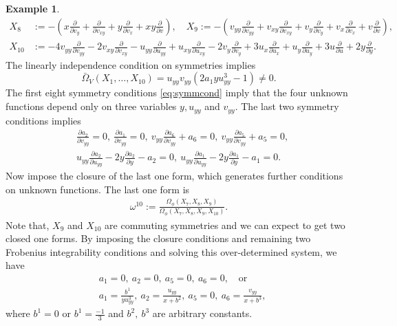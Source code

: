 \documentclass[a4paper, 11pt]{amsart}
\theoremstyle{definition}
\newtheorem{example}[theorem]{Example}
\begin{document}
\begin{example}
\begin{align*}
X_8&:=-(x{\frac{\partial}{\partial{v_y}}}+{\frac{\partial}{\partial{v_{xy}}}}+y{\frac{\partial}{\partial{v_x}}}+xy{\frac{\partial}{\partial{v}}}),\quad  X_9:=-(v_{yy}{\frac{\partial}{\partial{v_{yy}}}}+v_{xy}{\frac{\partial}{\partial{v_{xy}}}}+v_y{\frac{\partial}{\partial{v_y}}}+v_x{\frac{\partial}{\partial{v_x}}}+v{\frac{\partial}{\partial{v}}}),\\
X_{10}&:=-4v_{yy}{\frac{\partial}{\partial{v_{yy}}}}-2v_{xy}{\frac{\partial}{\partial{v_{xy}}}}-u_{yy}{\frac{\partial}{\partial{u_{yy}}}}+u_{xy}{\frac{\partial}{\partial{u_{xy}}}}-2v_{y}{\frac{\partial}{\partial{v_{y}}}}+3u_x{\frac{\partial}{\partial{u_{x}}}}+u_y{\frac{\partial}{\partial{u_y}}}+3u{\frac{\partial}{\partial{u}}}+2y{\frac{\partial}{\partial{y}}}.
\end{align*}
The linearly independence condition on symmetries implies \[\bar{\Omega}_V(X_1,\ldots,X_{10})=u_{yy}v_{yy}(2a_1yu_{yy}^3-1)\neq 0.\]
The first eight symmetry conditions \eqref{eq:symmcond} imply that the four unknown functions depend only on three variables $y,u_{yy}$ and $v_{yy}.$ The last two symmetry conditions implies
\begin{align*}
&{\frac{\partial{a_2}}{\partial{v_{yy}}}}=0,~{\frac{\partial{a_1}}{\partial{v_{yy}}}}=0,~v_{yy}{\frac{\partial{a_6}}{\partial{v_{yy}}}}+a_6=0,~v_{yy}{\frac{\partial{a_5}}{\partial{v_{yy}}}}+a_5=0,\\
&u_{yy}{\frac{\partial{a_2}}{\partial{u_{yy}}}}-2y{\frac{\partial{a_2}}{\partial{y}}}-a_2=0,~u_{yy}{\frac{\partial{a_1}}{\partial{u_{yy}}}}-2y{\frac{\partial{a_1}}{\partial{y}}}-a_1=0.
\end{align*}
 Now impose the closure of the last one form, which generates further conditions on unknown functions. The last one form is
\begin{align*}
  \omega^{10}:=\frac{\Omega_\phi(X_7,X_8,X_9)}{\Omega_\phi(X_7,X_8,X_9,X_{10})}.
\end{align*}
Note that, $X_9$ and $X_{10}$ are commuting symmetries and we can expect to get two closed one forms. By imposing the closure conditions and remaining two Frobenius integrability conditions and solving this over-determined system, we have
\begin{align*}
  &a_1=0,~a_2=0,~a_5=0,~a_6=0,\quad \text{or}\\
  &a_1=\frac{b^1}{yu_{yy}^3},~a_2=\frac{u_{yy}}{x+b^2},~a_5=0,~a_6=\frac{v_{yy}}{x+b^3},
\end{align*}
where $b^1=0$ or $b^1=\frac{-1}{3}$ and $b^2,~b^3$ are arbitrary constants.


\end{example}
\end{document}
